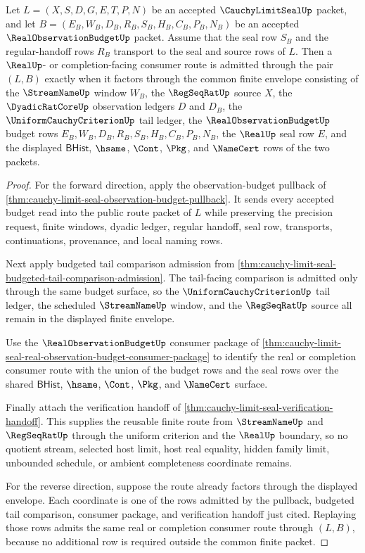 \begin{theorem}
\label{thm:cauchy-limit-seal-finite-window-budget-equivalence}
Let $L=(X,S,D,G,E,T,P,N)$ be an accepted $\CauchyLimitSealUp$ packet, and let $B=(E_B,W_B,D_B,R_B,S_B,H_B,C_B,P_B,N_B)$ be an accepted $\RealObservationBudgetUp$ packet. Assume that the seal row $S_B$ and the regular-handoff rows $R_B$ transport to the seal and source rows of $L$. Then a $\RealUp$- or completion-facing consumer route is admitted through the pair $(L,B)$ exactly when it factors through the common finite envelope consisting of the $\StreamNameUp$ window $W_B$, the $\RegSeqRatUp$ source $X$, the $\DyadicRatCoreUp$ observation ledgers $D$ and $D_B$, the $\UniformCauchyCriterionUp$ tail ledger, the $\RealObservationBudgetUp$ budget rows $E_B,W_B,D_B,R_B,S_B,H_B,C_B,P_B,N_B$, the $\RealUp$ seal row $E$, and the displayed $\mathsf{BHist}$, $\hsame$, $\Cont$, $\Pkg$, and $\NameCert$ rows of the two packets.
\end{theorem}
\begin{proof}
For the forward direction, apply the observation-budget pullback of \autoref{thm:cauchy-limit-seal-observation-budget-pullback}. It sends every accepted budget read into the public route packet of $L$ while preserving the precision request, finite windows, dyadic ledger, regular handoff, seal row, transports, continuations, provenance, and local naming rows.

Next apply budgeted tail comparison admission from \autoref{thm:cauchy-limit-seal-budgeted-tail-comparison-admission}. The tail-facing comparison is admitted only through the same budget surface, so the $\UniformCauchyCriterionUp$ tail ledger, the scheduled $\StreamNameUp$ window, and the $\RegSeqRatUp$ source all remain in the displayed finite envelope.

Use the $\RealObservationBudgetUp$ consumer package of \autoref{thm:cauchy-limit-seal-real-observation-budget-consumer-package} to identify the real or completion consumer route with the union of the budget rows and the seal rows over the shared $\mathsf{BHist}$, $\hsame$, $\Cont$, $\Pkg$, and $\NameCert$ surface.

Finally attach the verification handoff of \autoref{thm:cauchy-limit-seal-verification-handoff}. This supplies the reusable finite route from $\StreamNameUp$ and $\RegSeqRatUp$ through the uniform criterion and the $\RealUp$ boundary, so no quotient stream, selected host limit, host real equality, hidden family limit, unbounded schedule, or ambient completeness coordinate remains.

For the reverse direction, suppose the route already factors through the displayed envelope. Each coordinate is one of the rows admitted by the pullback, budgeted tail comparison, consumer package, and verification handoff just cited. Replaying those rows admits the same real or completion consumer route through $(L,B)$, because no additional row is required outside the common finite packet.
\end{proof}

